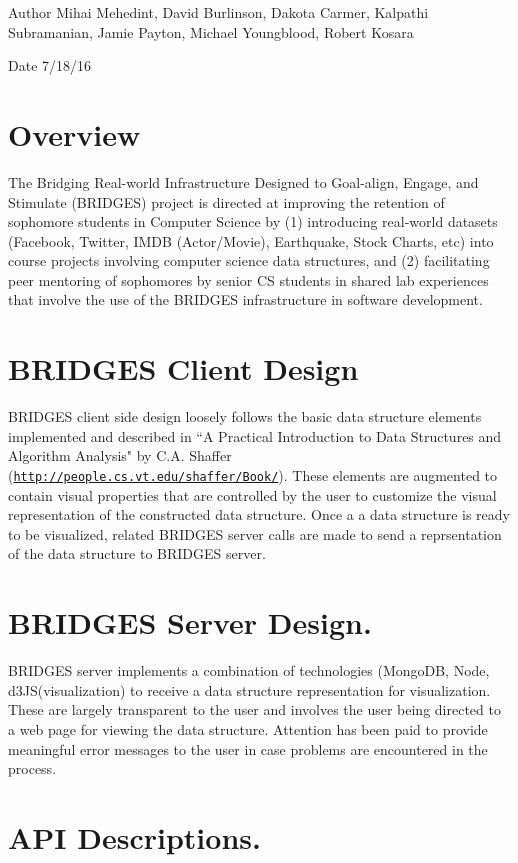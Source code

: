 \begin{DoxyAuthor}{Author}
Mihai Mehedint, David Burlinson, Dakota Carmer, Kalpathi Subramanian, Jamie Payton, Michael Youngblood, Robert Kosara 
\end{DoxyAuthor}
\begin{DoxyDate}{Date}
7/18/16
\end{DoxyDate}
\hypertarget{index_overview_sec}{}\section{Overview}\label{index_overview_sec}
The Bridging Real-\/world Infrastructure Designed to Goal-\/align, Engage, and Stimulate (B\+R\+I\+D\+G\+ES) project is directed at improving the retention of sophomore students in Computer Science by (1) introducing real-\/world datasets (Facebook, Twitter, I\+M\+DB (Actor/\+Movie), Earthquake, Stock Charts, etc) into course projects involving computer science data structures, and (2) facilitating peer mentoring of sophomores by senior CS students in shared lab experiences that involve the use of the B\+R\+I\+D\+G\+ES infrastructure in software development. \hypertarget{index_br_client}{}\section{B\+R\+I\+D\+G\+E\+S Client Design}\label{index_br_client}
B\+R\+I\+D\+G\+ES client side design loosely follows the basic data structure elements implemented and described in ``A Practical Introduction to Data Structures and Algorithm Analysis" by C.\+A. Shaffer (\href{http://people.cs.vt.edu/shaffer/Book/}{\tt http\+://people.\+cs.\+vt.\+edu/shaffer/\+Book/}). These elements are augmented to contain visual properties that are controlled by the user to customize the visual representation of the constructed data structure. Once a a data structure is ready to be visualized, related B\+R\+I\+D\+G\+ES server calls are made to send a reprsentation of the data structure to B\+R\+I\+D\+G\+ES server. \hypertarget{index_br_server}{}\section{B\+R\+I\+D\+G\+E\+S Server Design.}\label{index_br_server}
B\+R\+I\+D\+G\+ES server implements a combination of technologies (Mongo\+DB, Node, d3\+J\+S(visualization) to receive a data structure representation for visualization. These are largely transparent to the user and involves the user being directed to a web page for viewing the data structure. Attention has been paid to provide meaningful error messages to the user in case problems are encountered in the process. \hypertarget{index_api_sec}{}\section{A\+P\+I Descriptions.}\label{index_api_sec}
